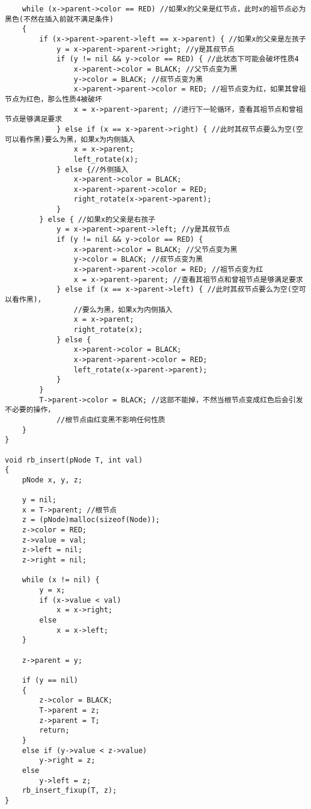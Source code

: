 \begin{verbatim}
    while (x->parent->color == RED) //如果x的父亲是红节点，此时x的祖节点必为黑色(不然在插入前就不满足条件)
    {
        if (x->parent->parent->left == x->parent) { //如果x的父亲是左孩子
            y = x->parent->parent->right; //y是其叔节点
            if (y != nil && y->color == RED) { //此状态下可能会破坏性质4
                x->parent->color = BLACK; //父节点变为黑
                y->color = BLACK; //叔节点变为黑
                x->parent->parent->color = RED; //祖节点变为红，如果其曾祖节点为红色，那么性质4被破坏
                x = x->parent->parent; //进行下一轮循环，查看其祖节点和曾祖节点是够满足要求
            } else if (x == x->parent->right) { //此时其叔节点要么为空(空可以看作黑)要么为黑，如果x为内侧插入
                x = x->parent;
                left_rotate(x);
            } else {//外侧插入
                x->parent->color = BLACK;
                x->parent->parent->color = RED;
                right_rotate(x->parent->parent);
            }
        } else { //如果x的父亲是右孩子
            y = x->parent->parent->left; //y是其叔节点
            if (y != nil && y->color == RED) {
                x->parent->color = BLACK; //父节点变为黑
                y->color = BLACK; //叔节点变为黑
                x->parent->parent->color = RED; //祖节点变为红
                x = x->parent->parent; //查看其祖节点和曾祖节点是够满足要求
            } else if (x == x->parent->left) { //此时其叔节点要么为空(空可以看作黑)，
                //要么为黑，如果x为内侧插入
                x = x->parent;
                right_rotate(x);
            } else {
                x->parent->color = BLACK;
                x->parent->parent->color = RED;
                left_rotate(x->parent->parent);
            }
        }
        T->parent->color = BLACK; //这部不能掉，不然当根节点变成红色后会引发不必要的操作，
            //根节点由红变黑不影响任何性质
    }
}

void rb_insert(pNode T, int val)
{
    pNode x, y, z;

    y = nil;
    x = T->parent; //根节点
    z = (pNode)malloc(sizeof(Node));
    z->color = RED;
    z->value = val;
    z->left = nil;
    z->right = nil;

    while (x != nil) {
        y = x;
        if (x->value < val)
            x = x->right;
        else
            x = x->left;
    }

    z->parent = y;

    if (y == nil)
    {
        z->color = BLACK;
        T->parent = z;
        z->parent = T;
        return;
    }
    else if (y->value < z->value)
        y->right = z;
    else
        y->left = z;
    rb_insert_fixup(T, z);
}


\end{verbatim}
